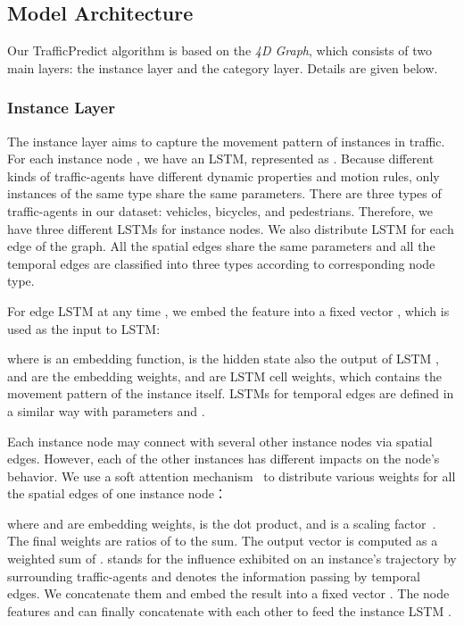 \documentclass[letterpaper]{article} \usepackage{aaai19}  \usepackage{times}  \usepackage{helvet}  \usepackage{courier}  \usepackage{url}  \usepackage{graphicx}  \usepackage{amsmath}
\begin{document}
\subsection{Model Architecture}
Our TrafficPredict algorithm is based on the \textit{4D Graph}, which consists of two main layers: the instance layer and the category layer. Details are given below.

\subsubsection{Instance Layer}
The instance layer aims to capture the movement pattern of instances in traffic. For each instance node , we have an LSTM, represented as . Because different kinds of traffic-agents have different dynamic properties and motion rules, only instances of the same type share the same parameters. There are three types of traffic-agents in our dataset: vehicles, bicycles, and pedestrians. Therefore, we have three different LSTMs for instance nodes. We also distribute LSTM  for each edge  of the graph. All the spatial edges share the same parameters and all the temporal edges are classified into three types according to corresponding node type. 

For edge LSTM  at any time , we embed the feature  into a fixed vector , which is used as the input to LSTM:
 
where  is an embedding function,  is the hidden state also the output of LSTM , and  are the embedding weights, and  are LSTM cell weights, which contains the movement pattern of the instance itself. LSTMs for temporal edges  are defined in a similar way with parameters  and .

Each instance node may connect with several other instance nodes via spatial edges. However, each of the other instances has different impacts on the node's behavior. We use a soft attention mechanism~\cite{vemula2017social} to distribute various weights for all the spatial edges of one instance node： 
 
  where  and  are embedding weights,  is the dot product, and  is a scaling factor~\cite{vaswani2017attention}. The final weights are ratios of  to the sum. The output vector  is computed as a weighted sum of .  stands for the influence exhibited on an instance's trajectory by surrounding traffic-agents and  denotes the information passing by temporal edges. We concatenate them and embed the result into a fixed vector . The node features  and  can finally concatenate with each other to feed the instance LSTM . 
  
\end{document}
